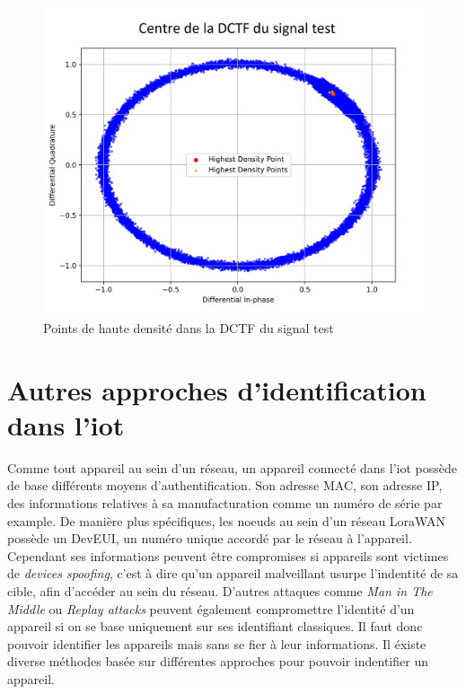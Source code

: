 \begin{figure}[h]
\centering

\includegraphics[scale=0.35]{images/dctf6.png}
\caption{Points de haute densité dans la DCTF du signal test}\label{term319}
\end{figure}


\section{Autres approches d'identification dans l'iot}\label{identification}

Comme tout appareil au sein d'un réseau, un appareil connecté dans l'iot possède de base différents moyens d'authentification. Son adresse MAC, son adresse IP, des informations relatives à sa manufacturation comme un numéro de série par example. De manière plus spécifiques, les noeuds au sein d'un réseau LoraWAN possède un DevEUI, un numéro unique accordé par le réseau à l'appareil. Cependant ses informations peuvent être compromises si appareils sont victimes de \textit{devices spoofing}, c'est à dire qu'un appareil malveillant usurpe l'indentité de sa cible, afin d'accéder au sein du réseau. D'autres attaques comme \textit{Man in The Middle} ou \textit{Replay attacks} peuvent également compromettre l'identité d'un appareil si on se base uniquement sur ses identifiant classiques\cite{attack}. Il faut donc pouvoir identifier les appareils mais sans se fier à leur informations. Il éxiste diverse méthodes basée sur différentes approches pour pouvoir indentifier un appareil. 

